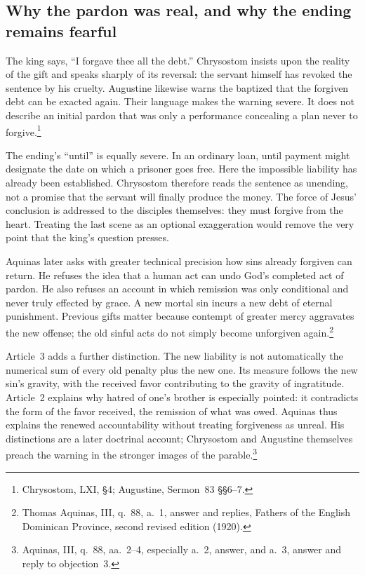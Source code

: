 \subsection{Why the pardon was real, and why the ending remains fearful}
The king says, ``I forgave thee all the debt.'' Chrysostom insists upon
the reality of the gift and speaks sharply of its reversal: the servant
himself has revoked the sentence by his cruelty. Augustine likewise
warns the baptized that the forgiven debt can be exacted again. Their
language makes the warning severe. It does not describe an initial
pardon that was only a performance concealing a plan never to forgive.\footnote{Chrysostom,  LXI, \S4; Augustine,
Sermon~83 \S\S6--7.}

The ending's ``until'' is equally severe. In an ordinary loan, until
payment might designate the date on which a prisoner goes free. Here
the impossible liability has already been established. Chrysostom
therefore reads the sentence as unending, not a promise that the
servant will finally produce the money. The force of Jesus' conclusion
is addressed to the disciples themselves: they must forgive from the
heart. Treating the last scene as an optional exaggeration would remove
the very point that the king's question presses.

Aquinas later asks with greater technical precision how sins already
forgiven can return. He refuses the idea that a human act can undo
God's completed act of pardon. He also refuses an account in which
remission was only conditional and never truly effected by grace.
A new mortal sin incurs a new debt of eternal punishment. Previous
gifts matter because contempt of greater mercy aggravates the new
offense; the old sinful acts do not simply become unforgiven again.\footnote{Thomas Aquinas,  III, q.~88,
a.~1, answer and replies, Fathers of the English Dominican Province,
second revised edition (1920).}

Article~3 adds a further distinction. The new liability is not
automatically the numerical sum of every old penalty plus the new
one. Its measure follows the new sin's gravity, with the received
favor contributing to the gravity of ingratitude. Article~2 explains
why hatred of one's brother is especially pointed: it contradicts
the form of the favor received, the remission of what was owed.
Aquinas thus explains the renewed accountability without treating
forgiveness as unreal. His distinctions are a later doctrinal account;
Chrysostom and Augustine themselves preach the warning in the stronger
images of the parable.\footnote{Aquinas, III, q.~88, aa.~2--4,
especially a.~2, answer, and a.~3, answer and reply to objection~3.}

